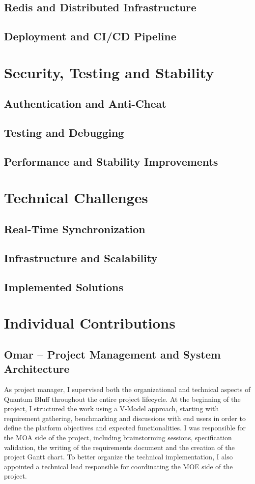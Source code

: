 \documentclass[11pt,a4paper]{article}
\begin{document}
\subsection{Redis and Distributed Infrastructure}
\subsection{Deployment and CI/CD Pipeline}
\newpage
\section{Security, Testing and Stability}
\subsection{Authentication and Anti-Cheat}
\subsection{Testing and Debugging}
\subsection{Performance and Stability Improvements}
\newpage
\section{Technical Challenges}
\subsection{Real-Time Synchronization}
\subsection{Infrastructure and Scalability}
\subsection{Implemented Solutions}
\newpage
\section{Individual Contributions}
\subsection{Omar -- Project Management and System Architecture}

As project manager, I supervised both the organizational and technical aspects of Quantum Bluff throughout the entire project lifecycle. At the beginning of the project, I structured the work using a V-Model approach, starting with requirement gathering, benchmarking and discussions with end users in order to define the platform objectives and expected functionalities. I was responsible for the MOA side of the project, including brainstorming sessions, specification validation, the writing of the requirements document and the creation of the project Gantt chart. To better organize the technical implementation, I also appointed a technical lead responsible for coordinating the MOE side of the project.
\end{document}

